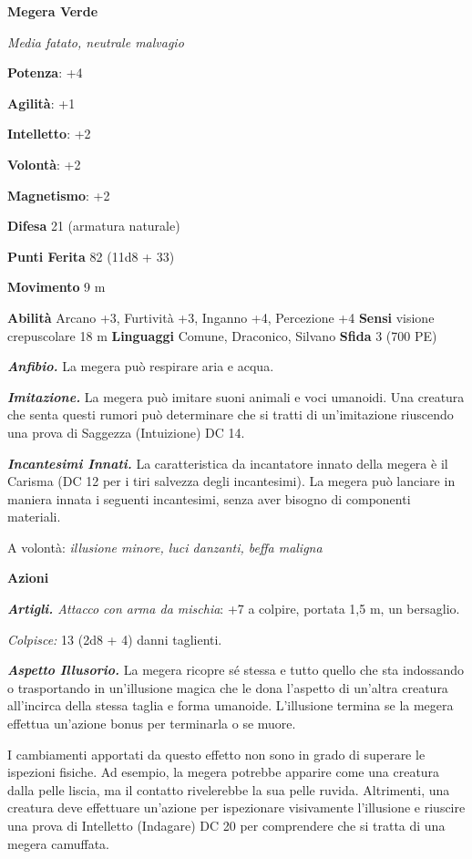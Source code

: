 \begin{multicols}{2}
\textbf{Megera Verde}

\emph{Media fatato, neutrale malvagio}

\textbf{Potenza}: +4

\textbf{Agilità}: +1

\textbf{Intelletto}: +2

\textbf{Volontà}: +2

\textbf{Magnetismo}: +2

\textbf{Difesa} 21 (armatura naturale)

\textbf{Punti Ferita} 82 (11d8 + 33)

\textbf{Movimento} 9 m

\textbf{Abilità} Arcano +3, Furtività +3, Inganno +4, Percezione +4
\textbf{Sensi} visione crepuscolare 18 m
\textbf{Linguaggi} Comune, Draconico, Silvano \textbf{Sfida} 3 (700 PE)

\emph{\textbf{Anfibio.}} La megera può respirare aria e acqua.

\emph{\textbf{Imitazione.}} La megera può imitare suoni animali e voci
umanoidi. Una creatura che senta questi rumori può determinare che si
tratti di un'imitazione riuscendo una prova di Saggezza (Intuizione) DC
14.

\emph{\textbf{Incantesimi Innati.}} La caratteristica da incantatore
innato della megera è il Carisma (DC 12 per i tiri salvezza degli
incantesimi). La megera può lanciare in maniera innata i seguenti
incantesimi, senza aver bisogno di componenti materiali.

A volontà: \emph{illusione minore, luci danzanti, beffa maligna}

\textbf{Azioni}

\emph{\textbf{Artigli.} Attacco con arma da mischia}: +7 a colpire,
portata 1,5 m, un bersaglio.

\emph{Colpisce:} 13 (2d8 + 4) danni taglienti.

\emph{\textbf{Aspetto Illusorio.}} La megera ricopre sé stessa e tutto
quello che sta indossando o trasportando in un'illusione magica che le
dona l'aspetto di un'altra creatura all'incirca della stessa taglia e
forma umanoide. L'illusione termina se la megera effettua un'azione
bonus per terminarla o se muore.

I cambiamenti apportati da questo effetto non sono in grado di superare
le ispezioni fisiche. Ad esempio, la megera potrebbe apparire come una
creatura dalla pelle liscia, ma il contatto rivelerebbe la sua pelle
ruvida. Altrimenti, una creatura deve effettuare un'azione per
ispezionare visivamente l'illusione e riuscire una prova di Intelletto
(Indagare) DC 20 per comprendere che si tratta di una megera camuffata.


\end{multicols}
